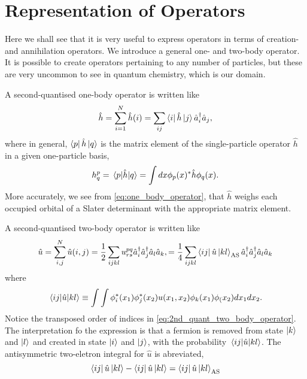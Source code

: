 \section{Representation of Operators}
    
    Here we shall see that it is very useful to express operators in terms of 
    creation- and annihilation operators. We introduce a general one- and two-body 
    operator. It is possible to create operators pertaining to any number of particles,
    but these are very uncommon to see in quantum chemistry, which is our domain.

    A second-quantised one-body operator is written like
    \begin{equation}
        \label{eq:one_body_operator}
        \hat{h} = \sum_{i=1}^N \hat{h}(i) 
        = \sum_{ij} \bra{i} \hat{h} \ket{j}\hat{a}_i^\dagger \hat{a}_j,
    \end{equation}
    where in general, $\bra{p} \hat{h} \ket{q}$ is the matrix element of the single-particle
    operator $\hat{h}$ in a given one-particle basis,
    \begin{equation}
        h^p_q = \mel{p}{\hat{h}}{q} = \int dx \phi_p(x)^* \hat{h} \phi_q(x).
    \end{equation}
    More accurately, we see from \autoref{eq:one_body_operator}, that $\hat{h}$
    weighs each occupied orbital of a Slater determinant with the appropriate 
    matrix element. 

    A second-quantised two-body operator is written like
    \begin{equation}
        \label{eq:2nd_quant_two_body_operator}
        \hat{u} = \sum_{i, j}^N\hat{u}(i,j) 
       = \frac{1}{2} \sum_{ijkl} u^{pq}_{rs}
            \hat{a}_i^\dagger \hat{a}_j^\dagger \hat{a}_l \hat{a}_k,
        = \frac{1}{4} \sum_{ijkl} \bra{ij}\hat{u}\ket{kl}_\text{AS} 
            \hat{a}_i^\dagger \hat{a}_j^\dagger \hat{a}_l \hat{a}_k
    \end{equation}
    where 
    \begin{equation}
        \mel{ij}{\hat{u}}{kl} 
        \equiv \int \int \phi_i^*(x_1) \phi_j^*(x_2)u(x_1, x_2) \phi_k(x_1)\phi_(x_2)
            dx_1 dx_2.
    \end{equation} 
    Notice the transposed order of indices in \ref{eq:2nd_quant_two_body_operator}.
    The interpretation fo the expression is that a fermion is removed from state 
    $\ket{k}$ and $\ket{l}$ and created in state $\ket{i}$ and $\ket{j}$, with 
    the probability $\mel{ij}{\hat{u}}{kl}$.
    The antisymmetric two-eletron integral for $\hat{u}$ is abreviated,
    \begin{equation}
        \bra{ij} \hat{u}\ket{kl} - \bra{ij}\hat{u} \ket{kl} 
        = \bra{ij}\hat{u} \ket{kl}_\text{AS}
    \end{equation}

